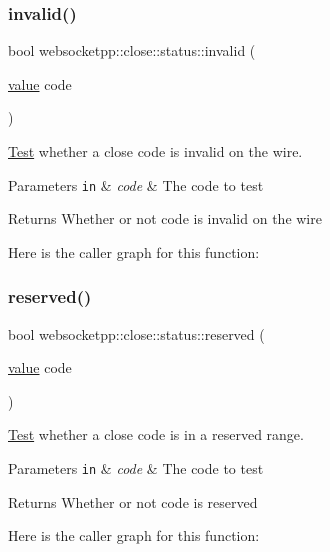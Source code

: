 \subsubsection{\texorpdfstring{invalid()}{invalid()}}
{\footnotesize\ttfamily bool websocketpp\+::close\+::status\+::invalid (\begin{DoxyParamCaption}\item[{\mbox{\hyperlink{namespacewebsocketpp_1_1close_1_1status_a8614a5c4733d708e2d2a32191c5bef84}{value}}}]{code }\end{DoxyParamCaption})\hspace{0.3cm}{\ttfamily [inline]}}



\mbox{\hyperlink{struct_test}{Test}} whether a close code is invalid on the wire. 


\begin{DoxyParams}[1]{Parameters}
\mbox{\tt in}  & {\em code} & The code to test \\
\hline
\end{DoxyParams}
\begin{DoxyReturn}{Returns}
Whether or not code is invalid on the wire 
\end{DoxyReturn}
Here is the caller graph for this function\+:
\mbox{\label{namespacewebsocketpp_1_1close_1_1status_af26a61f8a8c3247cf656349f96ea3008}} 
\subsubsection{\texorpdfstring{reserved()}{reserved()}}
{\footnotesize\ttfamily bool websocketpp\+::close\+::status\+::reserved (\begin{DoxyParamCaption}\item[{\mbox{\hyperlink{namespacewebsocketpp_1_1close_1_1status_a8614a5c4733d708e2d2a32191c5bef84}{value}}}]{code }\end{DoxyParamCaption})\hspace{0.3cm}{\ttfamily [inline]}}



\mbox{\hyperlink{struct_test}{Test}} whether a close code is in a reserved range. 


\begin{DoxyParams}[1]{Parameters}
\mbox{\tt in}  & {\em code} & The code to test \\
\hline
\end{DoxyParams}
\begin{DoxyReturn}{Returns}
Whether or not code is reserved 
\end{DoxyReturn}
Here is the caller graph for this function\+:
\mbox{\label{namespacewebsocketpp_1_1close_1_1status_a3f9ce953f12693f74493e2eb7a80952b}} 
